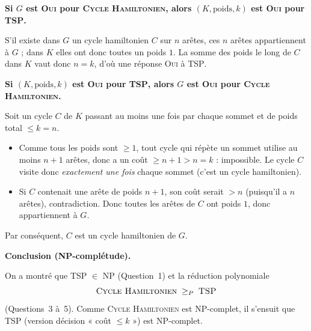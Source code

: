 \begin{corrections}
\begin{questions}
  \item \textbf{Si $G$ est \textsc{Oui} pour \textsc{Cycle Hamiltonien}, alors $(K,\text{poids},k)$ est \textsc{Oui} pour \textsc{TSP}.}
  
    S’il existe dans $G$ un cycle hamiltonien $C$ sur $n$ arêtes, ces $n$ arêtes appartiennent à $G$ ; dans $K$ elles ont donc toutes un poids $1$. La somme des poids le long de $C$ dans $K$ vaut donc $n=k$, d’où une réponse \textsc{Oui} à \textsc{TSP}.

  \item \textbf{Si $(K,\text{poids},k)$ est \textsc{Oui} pour \textsc{TSP}, alors $G$ est \textsc{Oui} pour \textsc{Cycle Hamiltonien}.}
  
    Soit un cycle $C$ de $K$ passant au moins une fois par chaque sommet et de poids total $\le k=n$.
    \begin{itemize}
      \item Comme tous les poids sont $\ge 1$, tout cycle qui répète un sommet utilise au moins $n+1$ arêtes, donc a un coût $\ge n+1>n=k$ : impossible. Le cycle $C$ visite donc \emph{exactement une fois} chaque sommet (c’est un cycle hamiltonien).
      \item Si $C$ contenait une arête de poids $n+1$, son coût serait $>n$ (puisqu’il a $n$ arêtes), contradiction. Donc toutes les arêtes de $C$ ont poids $1$, donc appartiennent à $G$.
    \end{itemize}
    Par conséquent, $C$ est un cycle hamiltonien de $G$.

  \item \textbf{Conclusion (NP-complétude).}
  
    On a montré que \textsc{TSP} $\in$ NP (Question~1) et la réduction polynomiale
    \[
      \textsc{Cycle Hamiltonien} \;\ge_P\; \textsc{TSP}
    \]
    (Questions~3 à~5). Comme \textsc{Cycle Hamiltonien} est NP-complet, il s’ensuit que \textsc{TSP} (version décision « coût $\le k$ ») est NP-complet.

  \end{questions}
\end{corrections}

\endgroup
\endinput
